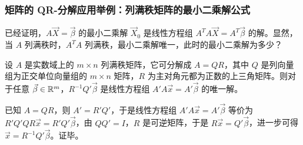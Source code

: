 \subsubsection{矩阵的 QR-分解应用举例：列满秩矩阵的最小二乘解公式}

已经证明，$A \vec X = \vec \beta$ 的最小二乘解 $\vec X_0$ 是线性方程组 $A^T A \vec X = A^T \vec \beta$ 的解。显然，当 $A$ 列满秩时，$A^T A$ 列满秩，最小二乘解唯一，此时的最小二乘解为多少？

\begin{theorem}[列满秩矩阵的最小二乘解]
	设 $A$ 是实数域上的 $m \times n$ 列满秩矩阵，它可分解成 $A = QR$，其中 $Q$ 是列向量组为正交单位向量组的 $m \times n$ 矩阵，$R$ 为主对角元都为正数的上三角矩阵。则对于任意 $\vec \beta \in \mathbb R^m$，$R^{-1} Q' \vec \beta$ 是线性方程组 $A'A \vec x = A' \vec \beta$ 的唯一解。
\end{theorem}

\begin{solve}
	已知 $A = QR$，则 $A' = R'Q'$，于是线性方程组 $A'A \vec x = A' \vec \beta$ 等价为 $R'Q'QR \vec x = R'Q' \vec \beta$，由 $QQ' = I$，$R$ 是可逆矩阵，于是 $R \vec x = Q' \vec \beta$，进一步可得 $\vec x = R^{-1} Q' \vec \beta$。证毕。
\end{solve}
